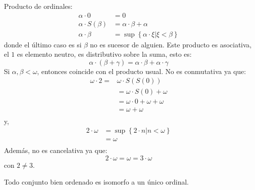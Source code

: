 \documentclass[12pt]{report}
\newcounter{it}
\theoremstyle{largebreak}
\begin{document}
    \begin{exa}
        Producto de ordinales:
        \begin{equation*}
            \begin{split}
                \alpha\cdot0 &= 0\\
                \alpha\cdot S(\beta) &=\alpha\cdot\beta+\alpha\\
                \alpha\cdot \beta&=\sup\left\{\alpha\cdot\xi\Big|\xi<\beta \right\}
            \end{split}
        \end{equation*}
        donde el último caso es si $\beta$ no es sucesor de alguien. Este producto es asociativa, el $1$ es elemento neutro, es distributivo sobre la suma, esto es:
        \begin{equation*}
            \alpha\cdot(\beta+\gamma)=\alpha\cdot\beta+\alpha\cdot\gamma
        \end{equation*}
        Si $\alpha,\beta<\omega$, entonces coincide con el producto usual. No es conmutativa ya que:
        \begin{equation*}
            \begin{split}
                \omega\cdot 2=&\omega\cdot S(S(0)) \\
                &=\omega\cdot S(0)+\omega\\
                &=\omega\cdot0+\omega+\omega\\
                &=\omega+\omega\\
            \end{split}
        \end{equation*}
        y,
        \begin{equation*}
            \begin{split}
                2\cdot\omega&=\sup\left\{2\cdot n\Big|n<\omega \right\}\\
                &=\omega\\
            \end{split}
        \end{equation*}
        Además, no es cancelativa ya que:
        \begin{equation*}
            2\cdot\omega=\omega=3\cdot\omega
        \end{equation*}
        con $2\neq 3$.
    \end{exa}

    \begin{theor}
        Todo conjunto bien ordenado es isomorfo a un único ordinal.
    \end{theor}
\end{document}
